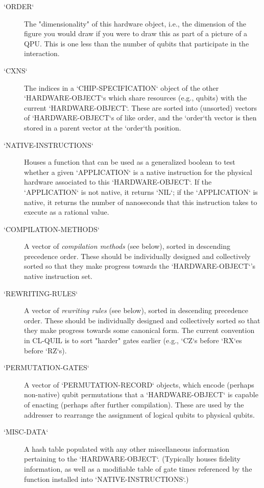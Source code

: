 \begin{description}
	\item[`ORDER`] The "dimensionality" of this hardware object, i.e., the dimension of the figure you would draw if you were to draw this as part of a picture of a QPU.  This is one less than the number of qubits that participate in the interaction.
	\item[`CXNS`] The indices in a `CHIP-SPECIFICATION` object of the other `HARDWARE-OBJECT`s which share resources (e.g., qubits) with the current `HARDWARE-OBJECT`.  These are sorted into (unsorted) vectors of `HARDWARE-OBJECT`s of like order, and the `order`th vector is then stored in a parent vector at the `order`th position.
	\item [`NATIVE-INSTRUCTIONS`] Houses a function that can be used as a generalized boolean to test whether a given `APPLICATION` is a native instruction for the physical hardware associated to this `HARDWARE-OBJECT`.  If the `APPLICATION` is not native, it returns `NIL`; if the `APPLICATION` is native, it returns the number of nanoseconds that this instruction takes to execute as a rational value.
	\item[`COMPILATION-METHODS`] A vector of \textit{compilation methods} (see below), sorted in descending precedence order.  These should be individually designed and collectively sorted so that they make progress towards the `HARDWARE-OBJECT`'s native instruction set.
	\item[`REWRITING-RULES`] A vector of \textit{rewriting rules} (see below), sorted in descending precedence order.  These should be individually designed and collectively sorted so that they make progress towards some canonical form.  The current convention in CL-QUIL is to sort "harder" gates earlier (e.g., `CZ`s before `RX`es before `RZ`s).
	\item[`PERMUTATION-GATES`] A vector of `PERMUTATION-RECORD` objects, which encode (perhaps non-native) qubit permutations that a `HARDWARE-OBJECT` is capable of enacting (perhaps after further compilation).  These are used by the addresser to rearrange the assignment of logical qubits to physical qubits.
	\item[`MISC-DATA`] A hash table populated with any other miscellaneous information pertaining to the `HARDWARE-OBJECT`.  (Typically houses fidelity information, as well as a modifiable table of gate times referenced by the function installed into `NATIVE-INSTRUCTIONS`.)
\end{description}

